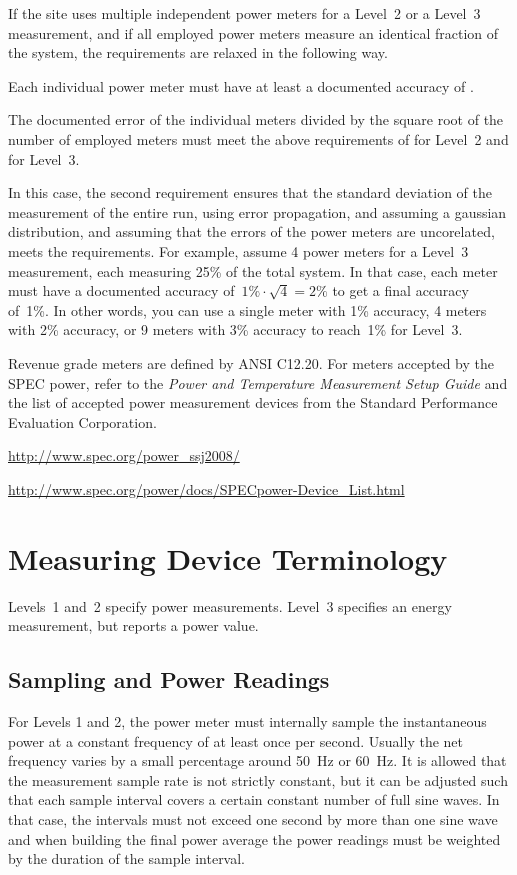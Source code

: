 \noindent
If the site uses multiple independent power meters for a Level~2 or a Level~3 measurement, and if all employed power meters measure an identical fraction of the system, the requirements are relaxed in the following way.
\begin{packed_item}
\item 
Each individual power meter must have at least a documented accuracy of \SpecAccuracyMeter{}.
\item
The documented error of the individual meters divided by the square root of the number of employed meters must meet the above requirements of \SpecAccuracyLTwo{} for Level~2 and \SpecAccuracyLThree{} for Level~3.
\end{packed_item}
In this case, the second requirement ensures that the standard deviation of the measurement of the entire run, using error propagation, and assuming a gaussian distribution, and assuming that the errors of the power meters are uncorelated, meets the requirements.
For example, assume 4 power meters for a Level~3 measurement, each measuring 25\% of the total system.
In that case, each meter must have a documented accuracy of~$1\% \cdot \sqrt{4} = 2\%$ to get a final accuracy of~1\%.
In other words, you can use a single meter with 1\% accuracy, 4 meters with 2\% accuracy, or 9 meters with 3\% accuracy to reach~1\% for Level~3.
\wl

\noindent
Revenue grade meters are defined by ANSI C12.20.
For meters accepted by the SPEC power, refer to the {\itshape Power and Temperature Measurement Setup Guide \/} and the list of accepted power measurement devices from the Standard Performance Evaluation Corporation.
\begin{packed_item}
\item 
\url{http://www.spec.org/power_ssj2008/}
\item
\url{http://www.spec.org/power/docs/SPECpower-Device_List.html }
\end{packed_item}
\wl

\section{Measuring Device Terminology}
\label{sec:MDTerm}
\noindent
Levels~1 and~2 specify power measurements.
Level~3 specifies an energy measurement, but reports a power value.

\subsection{Sampling and Power Readings}
\noindent
For Levels 1 and 2, the power meter must internally sample the instantaneous power at a constant frequency of at least once per second.
Usually the net frequency varies by a small percentage around 50~Hz or 60~Hz.
It is allowed that the measurement sample rate is not strictly constant, but it can be adjusted such that each sample interval covers a certain constant number of full sine waves.
In that case, the intervals must not exceed one second by more than one sine wave and when building the final power average the power readings must be weighted by the duration of the sample interval.
\wl

